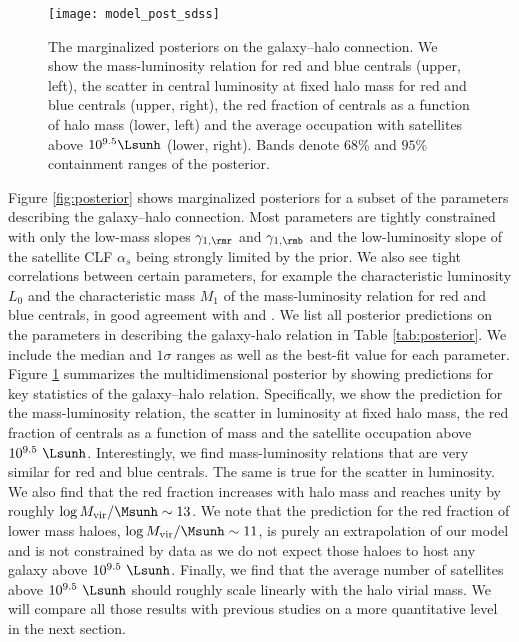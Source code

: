 \documentclass[fleqn,usenatbib,useAMS]{mnras}
\begin{document}
\begin{figure}
	\centering
	\texttt{[image: model\_post\_sdss]}
	\caption{The marginalized posteriors on the galaxy--halo connection. We show the mass-luminosity relation for red and blue centrals (upper, left), the scatter in central luminosity at fixed halo mass for red and blue centrals (upper, right), the red fraction of centrals as a function of halo mass (lower, left) and the average occupation with satellites above $10^{9.5} \Lsunh$ (lower, right). Bands denote $68\%$ and $95\%$ containment ranges of the posterior.}
	\label{fig:model_post}
\end{figure}

Figure \ref{fig:posterior} shows marginalized posteriors for a subset of the parameters describing the galaxy--halo connection. Most parameters are tightly constrained with only the low-mass slopes $\gamma_{1, \rmr}$ and $\gamma_{1, \rmb}$ and the low-luminosity slope of the satellite CLF $\alpha_s$ being strongly limited by the prior. We also see tight correlations between certain parameters, for example the characteristic luminosity $L_0$ and the characteristic mass $M_1$ of the mass-luminosity relation for red and blue centrals, in good agreement with \cite{Cacciato+13} and \cite{Zu+15}. We list all posterior predictions on the parameters in describing the galaxy-halo relation in Table \ref{tab:posterior}. We include the median and $1\sigma$ ranges as well as the best-fit value for each parameter. Figure \ref{fig:model_post} summarizes the multidimensional posterior by showing predictions for key statistics of the galaxy--halo relation. Specifically, we show the prediction for the mass-luminosity relation, the scatter in luminosity at fixed halo mass, the red fraction of centrals as a function of mass and the satellite occupation above $10^{9.5} \ \Lsunh$. Interestingly, we find mass-luminosity relations that are very similar for red and blue centrals. The same is true for the scatter in luminosity. We also find that the red fraction increases with halo mass and reaches unity by roughly $\log M_{\rm vir} / \Msunh \sim 13$. We note that the prediction for the red fraction of lower mass haloes, $\log M_{\rm vir} / \Msunh \sim 11$, is purely an extrapolation of our model and is not constrained by data as we do not expect those haloes to host any galaxy above $10^{9.5} \ \Lsunh$. Finally, we find that the average number of satellites above $10^{9.5} \ \Lsunh$ should roughly scale linearly with the halo virial mass. We will compare all those results with previous studies on a more quantitative level in the next section.
\end{document}
